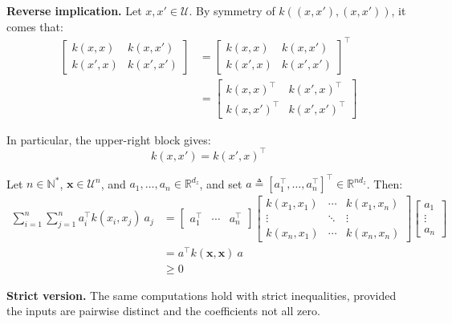 \textbf{Reverse implication.} Let $x,x'\in\mathcal{U}$. By symmetry of $k((x,x'),(x,x'))$, it comes that:
\begin{equation}
	\begin{aligned}
	\begin{bmatrix}
	k(x,x)&k(x,x')\\k(x',x)&k(x',x')
	\end{bmatrix}&=\begin{bmatrix}
	k(x,x)&k(x,x')\\k(x',x)&k(x',x')
	\end{bmatrix}^\top\\
	&=\begin{bmatrix}
	k(x,x)^\top&k(x',x)^\top\\k(x,x')^\top&k(x',x')^\top
	\end{bmatrix}
	\end{aligned}
\end{equation}

In particular, the upper-right block gives:
\begin{equation}
	k(x,x')=k(x',x)^\top
\end{equation}

Let $n\in\mathbb{N}^*$, $\mathbf{x}\in\mathcal{U}^n$, and $a_1,\dots,a_n\in\mathbb{R}^{d_z}$, and set $a\triangleq[a_1^\top,\dots,a_n^\top]^\top\in\mathbb{R}^{nd_z}$. Then:
\begin{equation}
	\begin{aligned}
	\sum_{i=1}^n\sum_{j=1}^na_i^\top k(x_i,x_j)\:a_j&=\begin{bmatrix}a_1^\top&\cdots&a_n^\top\end{bmatrix}\begin{bmatrix}k(x_1,x_1)&\cdots&k(x_1,x_n)\\\vdots&\ddots&\vdots\\k(x_n,x_1)&\cdots&k(x_n,x_n)\end{bmatrix}\begin{bmatrix}a_1\\\vdots\\a_n\end{bmatrix}\\
	&=a^\top k(\mathbf{x},\mathbf{x})\:a\\
	&\geq0
	\end{aligned}
\end{equation}

\textbf{Strict version.} The same computations hold with strict inequalities, provided the inputs are pairwise distinct and the coefficients not all zero.

